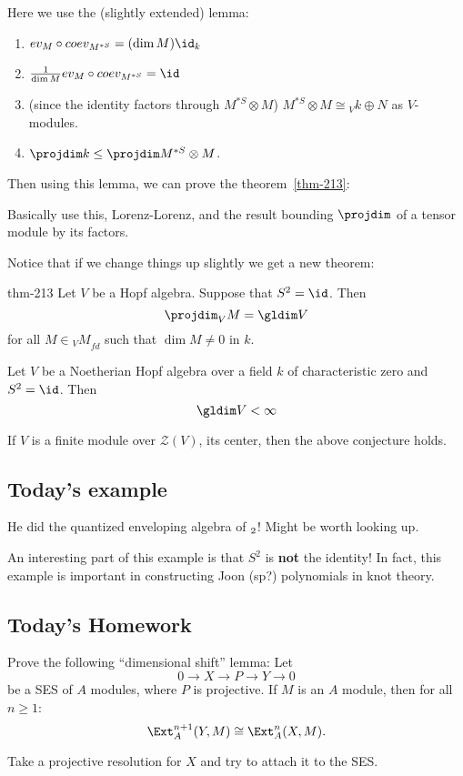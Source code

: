 \documentclass[12pt]{article}
\begin{document}
Here we use the (slightly extended) lemma:
\begin{lem}
	\begin{enumerate}
		\item $ev_M\circ coev_{M^{*S}}=(\dim M)\id_k$
		\item $\frac{1}{\dim M}ev_M\circ coev_{M^{*S}}=\id$
		\item (since the identity factors through $M^{*S}\otimes M$) $M^{*S}\otimes M\cong {_Vk}\oplus N$ as $V$-modules.
		\item $\projdim k\le \projdim M^{*S}\otimes M$.
	\end{enumerate}
\end{lem}
Then using this lemma, we can prove the theorem~\ref{thm-213}:
\begin{prf}
	Basically use this, Lorenz-Lorenz, and the result bounding $\projdim$ of a tensor module by its factors.
\end{prf}

Notice that if we change things up slightly we get a new theorem:
\begin{thm-prime}{thm-213}
	Let $V$ be a Hopf algebra. Suppose that $S^2=\id$. Then 
	\[\projdim_V M=\gldim V\]
	for all $M\in {_VM}_{fd}$ such that $\dim M\ne 0$ in $k$.
\end{thm-prime}

\begin{conj}
	Let $V$ be a Noetherian Hopf algebra over a field $k$ of characteristic zero and $S^2=\id$.
	Then
	\[\gldim V <\infty\]
\end{conj}

\begin{cor}
	If $V$ is a finite module over $\mathcal Z(V)$, its center, then the above conjecture holds.
\end{cor}

\subsection{Today's example}
He did the quantized enveloping algebra of $\sl_2$! Might be worth looking up.

An interesting part of this example is that $S^2$ is \textbf{not} the identity! In fact, 
this example is important in constructing Joon (sp?) polynomials in knot theory.

\subsection{Today's Homework}
\begin{prob}
	Prove the following ``dimensional shift'' lemma: Let
	\[0\to X\to P\to Y\to 0\]
	be a SES of $A$ modules, where $P$ is projective. If $M$ is an $A$ module, then for all $n\ge 1$:
	\[\Ext_A^{n+1}(Y,M)\cong\Ext^{n}_A(X,M).\]
\end{prob}
\begin{sol}
	Take a projective resolution for $X$ and try to attach it to the SES.
\end{sol}
\end{document}
